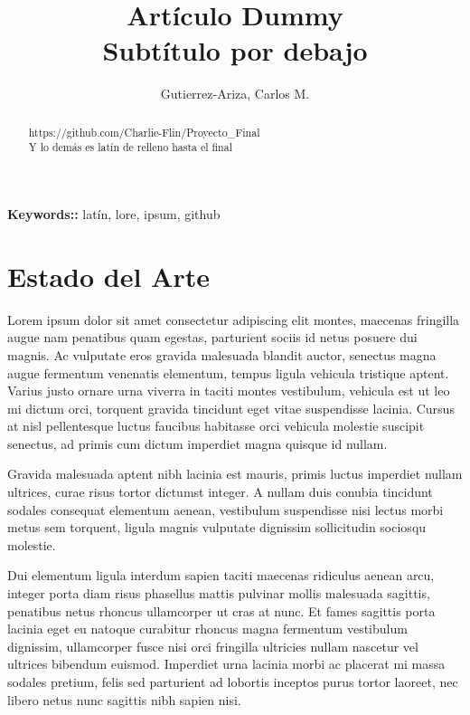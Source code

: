 \documentclass[a4paper,12pt]{article}
\begin{document}
\title{Artículo Dummy \\ \large{Subtítulo por debajo}}
\author{Gutierrez-Ariza, Carlos M.}
\maketitle

\begin{abstract}
  https://github.com/Charlie-Flin/Proyecto\_Final \\
  Y lo demás es latín de relleno hasta el final
\end{abstract}

\vspace{1cm}
{\bf Keywords::} latín, lore, ipsum, github

\pagebreak

\section{Estado del Arte}
Lorem ipsum dolor sit amet consectetur adipiscing elit montes, maecenas fringilla augue nam penatibus quam egestas, parturient sociis id netus posuere dui magnis. Ac vulputate eros gravida malesuada blandit auctor, senectus magna augue fermentum venenatis elementum, tempus ligula vehicula tristique aptent. Varius justo ornare urna viverra in taciti montes vestibulum, vehicula est ut leo mi dictum orci, torquent gravida tincidunt eget vitae suspendisse lacinia. Cursus at nisl pellentesque luctus faucibus habitasse orci vehicula molestie suscipit senectus, ad primis cum dictum imperdiet magna quisque id nullam.

Gravida malesuada aptent nibh lacinia est mauris, primis luctus imperdiet nullam ultrices, curae risus tortor dictumst integer. A nullam duis conubia tincidunt sodales consequat elementum aenean, vestibulum suspendisse nisi lectus morbi metus sem torquent, ligula magnis vulputate dignissim sollicitudin sociosqu molestie.

Dui elementum ligula interdum sapien taciti maecenas ridiculus aenean arcu, integer porta diam risus phasellus mattis pulvinar mollis malesuada sagittis, penatibus netus rhoncus ullamcorper ut cras at nunc. Et fames sagittis porta lacinia eget eu natoque curabitur rhoncus magna fermentum vestibulum dignissim, ullamcorper fusce nisi orci fringilla ultricies nullam nascetur vel ultrices bibendum euismod. Imperdiet urna lacinia morbi ac placerat mi massa sodales pretium, felis sed parturient ad lobortis inceptos purus tortor laoreet, nec libero netus nunc sagittis nibh sapien nisi.
\end{document}
